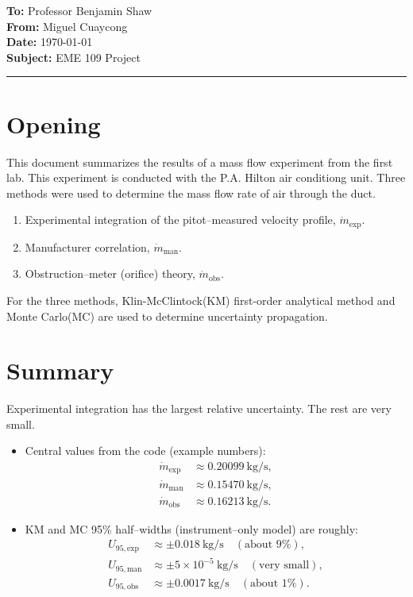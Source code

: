 \documentclass[11pt]{article}
\newcommand{\memoheader}[4]{
  \noindent
  \textbf{To:} #1\\
  \textbf{From:} #2\\ 
  \textbf{Date:} #3\\
  \textbf{Subject:} #4\\[1ex]\hrule\vspace{1.5ex}
}
\begin{document}
\memoheader{Professor Benjamin Shaw}
            {Miguel Cuaycong}
            {\today}
            {EME 109 Project}

\section{Opening}
This document summarizes the results of a mass flow experiment from the first lab.
This experiment is conducted with the P.A. Hilton air conditiong unit. 
Three methods were used to determine the mass flow rate of air through the duct. 
        \begin{enumerate}
          \item Experimental integration of the pitot--measured velocity
                profile, \( \dot m_{\text{exp}} \).
          \item Manufacturer correlation, \( \dot m_{\text{man}} \).
          \item Obstruction--meter (orifice) theory, \( \dot m_{\text{obs}} \).
        \end{enumerate}
For the three methods, Klin-McClintock(KM) first-order analytical method and Monte Carlo(MC) are used
to determine uncertainty propagation.

\section{Summary}
Experimental integration has the largest relative uncertainty. The rest are very small.
\begin{itemize}
  \item Central values from the code (example numbers):
        \begin{align*}
          \dot m_{\text{exp}} &\approx 0.20099~\text{kg/s}, \\
          \dot m_{\text{man}} &\approx 0.15470~\text{kg/s}, \\
          \dot m_{\text{obs}} &\approx 0.16213~\text{kg/s}.
        \end{align*}
  \item KM and MC 95\% half--widths (instrument--only model) are roughly:
        \begin{align*}
          U_{95,\text{exp}} &\approx \pm 0.018~\text{kg/s}
             \quad (\text{about } 9\%),\\
          U_{95,\text{man}} &\approx \pm 5\times10^{-5}~\text{kg/s}
             \quad (\text{very small}),\\
          U_{95,\text{obs}} &\approx \pm 0.0017~\text{kg/s}
             \quad (\text{about } 1\%).
        \end{align*}


\end{itemize}
\end{document}
